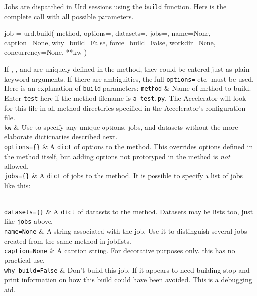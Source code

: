 Jobs are dispatched in Urd sessions using the \texttt{build} function.
Here is the complete call with all possible parameters.
\begin{python}
job = urd.build(
    method,
    options={}, datasets={}, jobs={},
    name=None, caption=None,
    why_build=False,
    force_build=False,
    workdir=None,
    concurrency=None,
    **kw
)
\end{python}
If \options, \datasets, and \jobs are uniquely defined in the method,
they could be entered just as plain keyword arguments.  If there are
ambiguities, the full \texttt{options=} etc.\ must be used.  Here is
an explanation of \texttt{build} parameters:
\starttabletwo
\RPtwo \texttt{method} & Name of method to build.  Enter \texttt{test}
    here if the method filename is \texttt{a\_test.py}.  The
    Accelerator will look for this file in all method directories
    specified in the Accelerator's configuration file.\\

\RPtwo \texttt{kw} & Use to specify any unique options, jobs, and datasets
    without the more elaborate dictionaries described next.\\
    
\RPtwo \texttt{options=\{\}} & A \texttt{dict} of options to the method.
    This overrides options defined in the method itself, but adding
    options not prototyped in the method is \textsl{not} allowed.\\

\RPtwo \texttt{jobs=\{\}} & A \texttt{dict} of jobs to the method.
    It is possible to specify a list of jobs like this:

\\

\RPtwo \texttt{datasets=\{\}} & A \texttt{dict} of datasets to the method.
    Datasets may be lists too, just like \texttt{jobs} above.\\

\RPtwo \texttt{name=None} & A string associated with the job.  Use it
    to distinguish several jobs created from the same method in
    joblists.\\

\RPtwo \texttt{caption=None} & A caption string.  For decorative purposes
    only, this has no practical use.\\

\RPtwo \texttt{why\_build=False} & Don't build this job. If it appears to
    need building stop and print information on how this build could have
    been avoided. This is a debugging aid.\\

